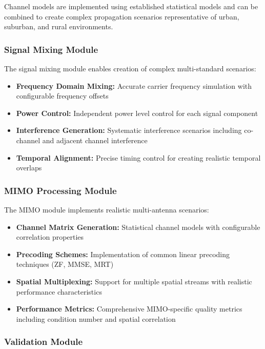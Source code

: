 \documentclass[conference]{IEEEtran}
\begin{document}
Channel models are implemented using established statistical models and can be combined to create complex propagation scenarios representative of urban, suburban, and rural environments.

\subsubsection{Signal Mixing Module}

The signal mixing module enables creation of complex multi-standard scenarios:

\begin{itemize}
\item \textbf{Frequency Domain Mixing:} Accurate carrier frequency simulation with configurable frequency offsets
\item \textbf{Power Control:} Independent power level control for each signal component
\item \textbf{Interference Generation:} Systematic interference scenarios including co-channel and adjacent channel interference
\item \textbf{Temporal Alignment:} Precise timing control for creating realistic temporal overlaps
\end{itemize}

\subsubsection{MIMO Processing Module}

The MIMO module implements realistic multi-antenna scenarios:

\begin{itemize}
\item \textbf{Channel Matrix Generation:} Statistical channel models with configurable correlation properties
\item \textbf{Precoding Schemes:} Implementation of common linear precoding techniques (ZF, MMSE, MRT)
\item \textbf{Spatial Multiplexing:} Support for multiple spatial streams with realistic performance characteristics
\item \textbf{Performance Metrics:} Comprehensive MIMO-specific quality metrics including condition number and spatial correlation
\end{itemize}

\subsubsection{Validation Module}
\end{document}
